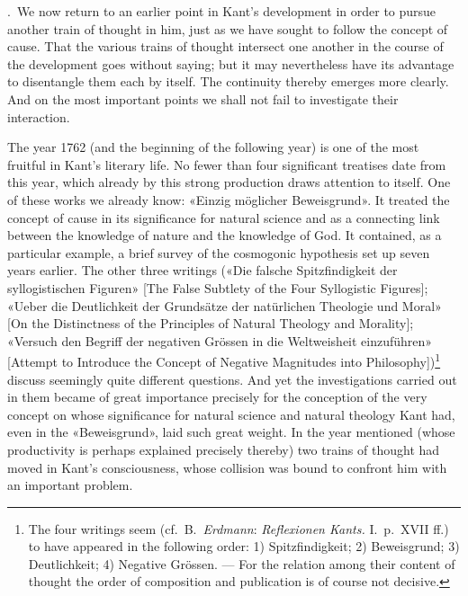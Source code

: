 \documentclass[12pt,a4paper]{article}
\begin{document}
.\ We now return to an earlier point in Kant's development in
order to pursue another train of thought in him, just as we have sought to
follow the concept of cause. That the various trains of thought intersect
one another in the course of the development goes without saying; but it
may nevertheless have its advantage to disentangle them each by itself.
The continuity thereby emerges more clearly. And on the most important
points we shall not fail to investigate their interaction.

The year 1762 (and the beginning of the following year) is one of the most
fruitful in Kant's literary life. No fewer than four significant treatises
date from this year, which already by this strong production draws
attention to itself. One of these works we already know: «Einzig möglicher
Beweisgrund». It treated the concept of cause in its significance for
natural science and as a connecting link between the knowledge of nature
and the knowledge of God. It contained, as a particular example, a brief
survey of the cosmogonic hypothesis set up seven years earlier. The other
three writings («Die falsche Spitzfindigkeit der syllogistischen Figuren»
[The False Subtlety of the Four Syllogistic Figures]; «Ueber die
Deutlichkeit der Grundsätze der natürlichen Theologie und Moral» [On the
Distinctness of the Principles of Natural Theology and Morality]; «Versuch
den Begriff der negativen Grössen in die Weltweisheit einzuführen»
[Attempt to Introduce the Concept of Negative Magnitudes into
Philosophy])\footnote{The four writings seem (cf.\ B.\ \emph{Erdmann}:
\textit{Reflexionen Kants.} I.\ p.\ XVII ff.) to have appeared in the
following order: 1) Spitzfindigkeit; 2) Beweisgrund; 3) Deutlichkeit; 4)
Negative Grössen. --- For the relation among their content of thought the
order of composition and publication is of course not decisive.} discuss
seemingly quite different questions. And yet the investigations carried
out in them became of great importance precisely for the conception of the
very concept on whose significance for natural science and natural
theology Kant had, even in the «Beweisgrund», laid such great weight. In
the year mentioned (whose productivity is perhaps explained precisely
thereby) two trains of thought had moved in Kant's consciousness, whose
collision was bound to confront him with an important problem.
\end{document}
